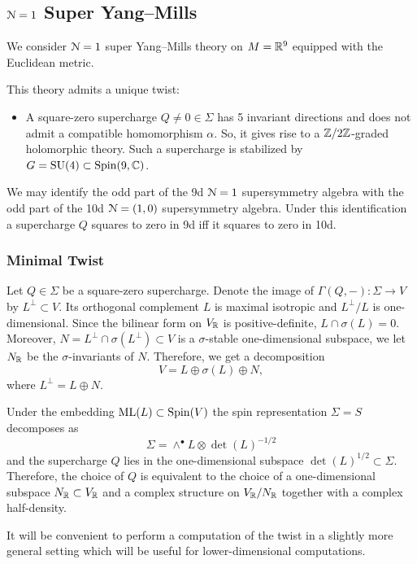 \documentclass[10pt, oneside]{article}
\newcommand{\ML}{\mathrm{ML}}
\begin{document}
\subsection{\texorpdfstring{$\mathcal N=1$}{N=1} Super Yang--Mills}

We consider $\mathcal N=1$ super Yang--Mills theory on $M=\mathbb R^9$ equipped with the Euclidean metric.

This theory admits a unique twist:
\begin{itemize}
\item A square-zero supercharge $Q\neq 0\in\Sigma$ has 5 invariant directions and does not admit a compatible homomorphism $\alpha$. So, it gives rise to a $\mathbb Z/2\mathbb Z$-graded holomorphic theory. Such a supercharge is stabilized by $G=\mathrm{SU}(4)\subset \mathrm{Spin}(9, \mathbb C)$.
\end{itemize}

We may identify the odd part of the 9d $\mathcal{N}=1$ supersymmetry algebra with the odd part of the 10d $\mathcal{N}=(1, 0)$ supersymmetry algebra. Under this identification a supercharge $Q$ squares to zero in 9d iff it squares to zero in 10d.

\subsubsection{Minimal Twist}
\label{sect:9dminimaltwist}

Let $Q\in\Sigma$ be a square-zero supercharge. Denote the image of $\Gamma(Q, -)\colon \Sigma\rightarrow V$ by $L^\perp\subset V$. Its orthogonal complement $L$ is maximal isotropic and $L^{\perp}/L$ is one-dimensional. Since the bilinear form on $V_\mathbb R$ is positive-definite, $L\cap \sigma(L) = 0$. Moreover, $N = L^{\perp}\cap \sigma(L^{\perp})\subset V$ is a $\sigma$-stable one-dimensional subspace, we let $N_\mathbb R$ be the $\sigma$-invariants of $N$. Therefore, we get a decomposition
\[V = L\oplus \sigma(L)\oplus N,\]
where $L^{\perp} = L\oplus N$.

Under the embedding $\ML(L)\subset \Spin(V)$ the spin representation $\Sigma=S$ decomposes as
\[\Sigma = \wedge^\bullet L\otimes \det(L)^{-1/2}\]
and the supercharge $Q$ lies in the one-dimensional subspace $\det(L)^{1/2}\subset \Sigma$. Therefore, the choice of $Q$ is equivalent to the choice of a one-dimensional subspace $N_\mathbb R\subset V_\mathbb R$ and a complex structure on $V_\mathbb R/N_\mathbb R$ together with a complex half-density.

It will be convenient to perform a computation of the twist in a slightly more general setting which will be useful for lower-dimensional computations.
\end{document}
